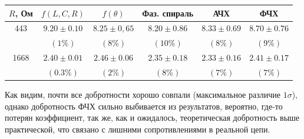 \documentclass[a4paper,12pt]{extarticle}
\begin{document}
\begin{enumerate}
    \begin{table}[h]
        \centering
        \begin{tabular}{|c|c|c|c|c|c|}
                \hline
                $R$, Ом & $f(L, C, R)$ & $f(\theta)$ & Фаз. спираль & АЧХ & ФЧХ \\ \hline
                443 & $9.20 \pm 0.10$ & $8.25 \pm 0,65$& $8.20 \pm 0.86$ & $8.33 \pm 0.69$ & $8.70\pm 0.76$ \\
                & $(1\%)$ & $(8\%)$ & $(10\%)$ & $(8\%)$ & $(9\%)$  \\ \hline
                1668 & $2.40 \pm 0.01$ & $ 2.46 \pm 0.06$ & $ 2.35 \pm 0.18$ & $2.33 \pm 0.16  $ & $2.41 \pm 0.17 $ \\
                & $(0.3 \%)$ & $(2\%) $ & $(8\%) $ & $(7 \%) $ & $(7 \%) $ \\ \hline
        \end{tabular}
    \end{table}

    Как видим, почти все добротности хорошо совпали (максимальное различие $1 \sigma$), однако добротность ФЧХ сильно выбивается из результатов, вероятно, где-то потерян коэффициент, так же, как и ожидалось, теоретическая добротность выше практической, что связано с лишними сопротивлениями в реальной цепи.


\end{enumerate}
\end{document}
